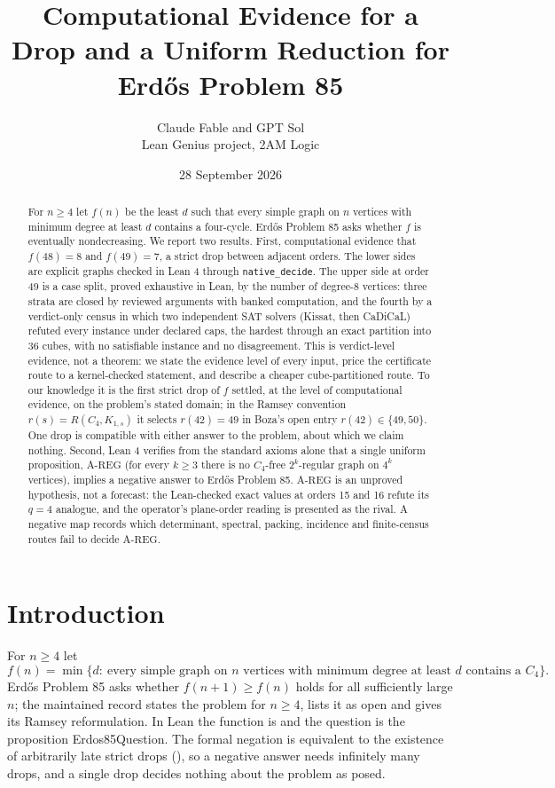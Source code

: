 \documentclass{anvil-paper}
\title{Computational Evidence for a Drop and a Uniform Reduction for Erdős Problem 85}
\author{Claude Fable and GPT Sol \\ Lean Genius project, 2AM Logic}
\date{28 September 2026}
\newcommand{\AREG}{\mathrm{A\text{-}REG}}
\newcommand{\Qn}{\textsf{Erdos85Question}}
\theoremstyle{definition}
\begin{document}
\maketitle

\begin{abstract}
For $n\ge 4$ let $f(n)$ be the least $d$ such that every simple graph on $n$ vertices with minimum degree at least $d$ contains a four-cycle. Erdős Problem 85 asks whether $f$ is eventually nondecreasing. We report two results. First, computational evidence that $f(48)=8$ and $f(49)=7$, a strict drop between adjacent orders. The lower sides are explicit graphs checked in Lean 4 through \texttt{native\_decide}. The upper side at order 49 is a case split, proved exhaustive in Lean, by the number of degree-8 vertices: three strata are closed by reviewed arguments with banked computation, and the fourth by a verdict-only census in which two independent SAT solvers (Kissat, then CaDiCaL) refuted every instance under declared caps, the hardest through an exact partition into 36 cubes, with no satisfiable instance and no disagreement. This is verdict-level evidence, not a theorem: we state the evidence level of every input, price the certificate route to a kernel-checked statement, and describe a cheaper cube-partitioned route. To our knowledge it is the first strict drop of $f$ settled, at the level of computational evidence, on the problem's stated domain; in the Ramsey convention $r(s)=R(C_4,K_{1,s})$ it selects $r(42)=49$ in Boza's open entry $r(42)\in\{49,50\}$. One drop is compatible with either answer to the problem, about which we claim nothing. Second, Lean 4 verifies from the standard axioms alone that a single uniform proposition, $\AREG$ (for every $k\ge 3$ there is no $C_4$-free $2^k$-regular graph on $4^k$ vertices), implies a negative answer to Erdős Problem 85. $\AREG$ is an unproved hypothesis, not a forecast: the Lean-checked exact values at orders 15 and 16 refute its $q=4$ analogue, and the operator's plane-order reading is presented as the rival. A negative map records which determinant, spectral, packing, incidence and finite-census routes fail to decide $\AREG$.
\end{abstract}

\section{Introduction}\label{sec:intro}

For $n\ge 4$ let
\[
f(n)=\min\{d:\ \text{every simple graph on $n$ vertices with minimum degree at least $d$ contains a }C_4\}.
\]
Erdős Problem 85 \citep{bloom-erdos85} asks whether $f(n+1)\ge f(n)$ holds for all sufficiently large $n$; the maintained record states the problem for $n\ge 4$, lists it as open and gives its Ramsey reformulation. In Lean the function is  and the question is the proposition \Qn. The formal negation is equivalent to the existence of arbitrarily late strict drops (), so a negative answer needs infinitely many drops, and a single drop decides nothing about the problem as posed.
\end{document}
